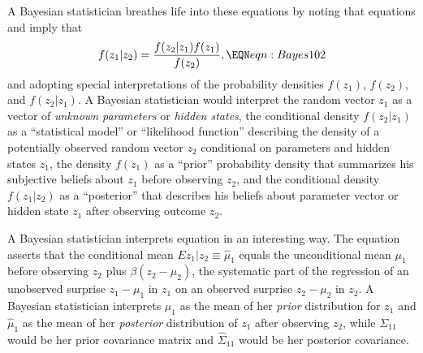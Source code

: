 A Bayesian statistician breathes life into these equations %
 by noting that equations  and 
imply that
$$ f(z_1 | z_2) =  {\frac{f(z_2|z_1) f(z_1)}{f(z_2)} } ,  \EQN eqn:Bayes102 $$
and adopting  special interpretations of the probability
densities $f(z_1)$, $f(z_2)$,  and $f(z_2|z_1)$. 
A Bayesian statistician would interpret
the random vector $z_1$ as a  vector of   {\it unknown parameters} or {\it hidden states},
  the conditional density $f(z_2|z_1)$ as a ``statistical model'' or ``likelihood function'' describing
the density of a potentially observed  random vector $z_2$ conditional on parameters and hidden states $z_1$,  the density $f(z_1)$ as a ``prior''
 probability density
that summarizes his subjective
beliefs about $z_1$ before observing $z_2$, and  the conditional
density $f(z_1| z_2)$ as a ``posterior'' that describes his beliefs about  parameter vector or hidden state $z_1$ after observing outcome
$z_2$.
%
%
%
%

A Bayesian statistician interprets equation  in an interesting  way. The equation
 asserts that the conditional mean $E z_1 | z_2 \equiv \hat \mu_1$ equals the unconditional mean $\mu_1$ before observing $z_2$
plus  $\beta (z_2 - \mu_2)$, the systematic part of the regression  of an unobserved surprise $z_1 - \mu_1$ in $z_1$ on an observed surprise
$z_2 - \mu_2$ in $z_2$.
A Bayesian statistician  interprets $\mu_1$ as the mean of her {\it prior\/} distribution for $z_1$ and $\hat \mu_1$ as the mean of her
{\it posterior\/} distribution of $z_1$ after observing $z_2$, while $\Sigma_{11}$ would be her prior covariance matrix and $\hat \Sigma_{11}$ would be her
posterior covariance.

